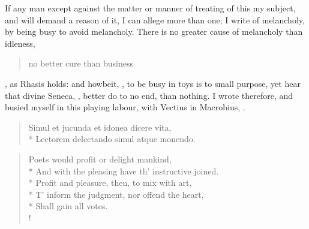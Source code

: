 {If any man except against the matter or manner of treating of this my
subject, and will demand a reason of it, I can allege more than one; I
write of melancholy, by being busy to avoid melancholy. There is no
greater cause of melancholy than idleness, \blockquote{no better cure than business}, as Rhasis holds: and howbeit,
, to be busy in toys is to small purpose, yet hear that
divine Seneca, , better do to no end, than
nothing. I wrote therefore, and busied myself in this playing labour,
 with Vectius in
Macrobius, .
\begin{verse}
Simul et jucunda et idonea dicere vita,\\*
Lectorem delectando simul atque monendo.
\end{verse}

\begin{verse}
Poets would profit or delight mankind,\\*
And with the pleasing have th' instructive joined.\\*
Profit and pleasure, then, to mix with art,\\*
T' inform the judgment, nor offend the heart,\\*
Shall gain all votes.\\!
\end{verse}

}
